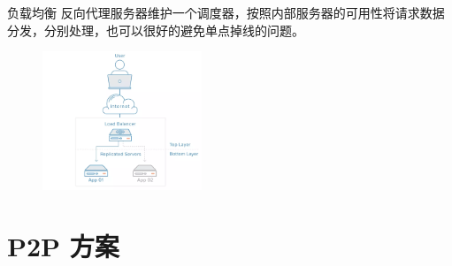 \begin{xframe}{负载均衡}
	反向代理服务器维护一个调度器，按照内部服务器的可用性将请求数据分发，分别处理，也可以很好的避免单点掉线的问题。
	
	\begin{figure}[h]
		\includegraphics[width=180px]{k1k3EfHndY.png}
	\end{figure}
\end{xframe}

%	
	


\section{P2P 方案}

